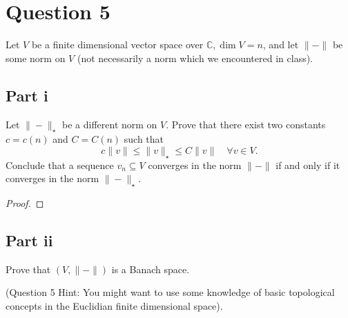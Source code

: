 \section{Question 5}

\begin{question}
    Let $V$ be a finite dimensional vector space over $\mathbb{C}, \operatorname{dim} V=n$, and let $\|-\|$ be some norm on $V$ (not necessarily a norm which we encountered in class).
\end{question}

\subsection{Part i}

\begin{question}
    Let $\|-\|_{\star}$ be a different norm on $V$. Prove that there exist two constants $c=c(n)$ and $C=C(n)$ such that
    \begin{equation}
        c\|v\| \leq\|v\|_{\star} \leq C\|v\| \quad \forall v \in V . 
    \end{equation}
    Conclude that a sequence $v_n \subseteq V$ converges in the norm $\|-\|$ if and only if it converges in the norm $\|-\|_{\star}$.
\end{question}

\begin{answer}
    \begin{proof}
        
    \end{proof}
\end{answer}

\subsection{Part ii}

\begin{question}
    Prove that $(V,\|-\|)$ is a Banach space.
    
    (Question 5 Hint: You might want to use some knowledge of basic topological concepts in the Euclidian finite dimensional space).
\end{question}

\begin{answer}
    
\end{answer}